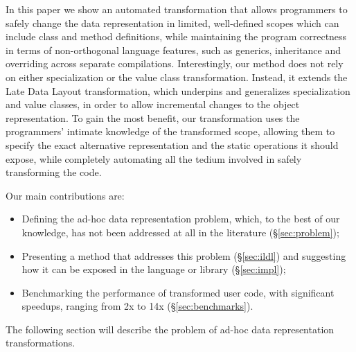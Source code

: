 In this paper we show an automated transformation that allows programmers to safely change the data representation in limited, well-defined scopes which can include class and method definitions, while maintaining the program correctness in terms of non-orthogonal language features, such as generics, inheritance and overriding across separate compilations. Interestingly, our method does not rely on either specialization or the value class transformation. Instead, it extends the Late Data Layout transformation, which underpins and generalizes specialization and value classes, in order to allow incremental changes to the object representation. To gain the most benefit, our transformation uses the programmers' intimate knowledge of the transformed scope, allowing them to specify the exact alternative representation and the static operations it should expose, while completely automating all the tedium involved in safely transforming the code.

Our main contributions are:
\begin{itemize}
  \item Defining the ad-hoc data representation problem, which, to the best of our knowledge, has not been addressed at all in the literature (\S\ref{sec:problem});
  \item Presenting a method that addresses this problem (\S\ref{sec:ildl}) and suggesting how it can be exposed in the language or library (\S\ref{sec:impl});
  \item Benchmarking the performance of transformed user code, with significant speedups, ranging from 2x to 14x (\S\ref{sec:benchmarks}).
\end{itemize}

The following section will describe the problem of ad-hoc data representation transformations.